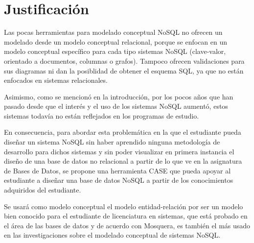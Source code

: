 \section{Justificación}

Las pocas herramientas para modelado conceptual NoSQL no ofrecen un modelado desde un modelo conceptual relacional, porque se enfocan en un modelo conceptual específico para cada tipo sistemas NoSQL (clave-valor, orientado a documentos, columnas o grafos). Tampoco ofrecen validaciones para sus diagramas ni dan la posiblidad de obtener el esquema SQL, ya que no están enfocados en sistemas relacionales.


Asimismo, como se mencionó en la introducción, por los pocos años que han pasado desde que el interés y el uso de los sistemas NoSQL aumentó, estos sistemas todavía no están reflejados en los programas de estudio.


En consecuencia, para abordar esta problemática en la que el estudiante pueda diseñar un sistema NoSQL sin haber aprendido ninguna metodología de desarrollo para dichos sistemas y sin poder visualizar en primera instancia el diseño de una base de datos no relacional a partir de lo que ve en la asignatura de Bases de Datos, se propone una herramienta CASE que pueda apoyar al estudiante a diseñar una base de datos NoSQL a partir de los conocimientos adquiridos del estudiante.


Se usará como modelo conceptual el modelo entidad-relación por ser un modelo bien conocido para el estudiante de licenciatura en sistemas, que está probado en el área de las bases de datos y de acuerdo con Mosquera\cite{martinez-mosquera_modeling_2020}, es también el más usado en las investigaciones sobre el modelado conceptual de sistemas NoSQL.



